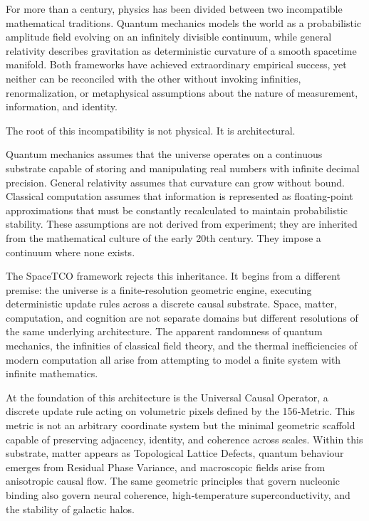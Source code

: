 \documentclass[reprint,amsmath,amssymb,aps,prl,floatfix]{revtex4-2}
\begin{document}
For more than a century, physics has been divided between two incompatible mathematical traditions. Quantum mechanics models the world as a probabilistic amplitude field evolving on an infinitely divisible continuum, while general relativity describes gravitation as deterministic curvature of a smooth spacetime manifold. Both frameworks have achieved extraordinary empirical success, yet neither can be reconciled with the other without invoking infinities, renormalization, or metaphysical assumptions about the nature of measurement, information, and identity.
\medskip

The root of this incompatibility is not physical. It is architectural.
\medskip

Quantum mechanics assumes that the universe operates on a continuous substrate capable of storing and manipulating real numbers with infinite decimal precision. General relativity assumes that curvature can grow without bound. Classical computation assumes that information is represented as floating‑point approximations that must be constantly recalculated to maintain probabilistic stability. These assumptions are not derived from experiment; they are inherited from the mathematical culture of the early 20th century. They impose a continuum where none exists.
\medskip

The SpaceTCO framework rejects this inheritance. It begins from a different premise: the universe is a finite‑resolution geometric engine, executing deterministic update rules across a discrete causal substrate. Space, matter, computation, and cognition are not separate domains but different resolutions of the same underlying architecture. The apparent randomness of quantum mechanics, the infinities of classical field theory, and the thermal inefficiencies of modern computation all arise from attempting to model a finite system with infinite mathematics.
\medskip

At the foundation of this architecture is the Universal Causal Operator, a discrete update rule acting on volumetric pixels defined by the 156‑Metric. This metric is not an arbitrary coordinate system but the minimal geometric scaffold capable of preserving adjacency, identity, and coherence across scales. Within this substrate, matter appears as Topological Lattice Defects, quantum behaviour emerges from Residual Phase Variance, and macroscopic fields arise from anisotropic causal flow. The same geometric principles that govern nucleonic binding also govern neural coherence, high‑temperature superconductivity, and the stability of galactic halos.
\medskip
\end{document}
